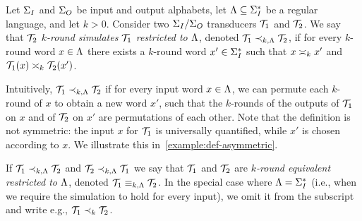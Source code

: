Let $\sI$ and $\sO$ be input and output alphabets, let $\fL\subseteq \sI^*$ be a regular language, and let $k>0$. Consider two $\sI/\sO$ transducers $\cT_1$ and $\cT_2$. We say that \emph{$\cT_2$ $k$-round simulates $\cT_1$ restricted to $\fL$}, denoted $\cT_1\prec_{k,\fL} \cT_2$, if for every $k$-round word $x\in \fL$ there exists a $k$-round word $x'\in \sI^*$ such that $x\req[k] x'$ and $\cT_1(x)\req[k] \cT_2(x')$. 

Intuitively, $\cT_1\prec_{k,\fL} \cT_2$ if for every input word $x\in \fL$, we can permute each $k$-round of $x$ to obtain a new word $x'$, such that the $k$-rounds of the outputs of $\cT_1$ on $x$ and of $\cT_2$ on $x'$ are permutations of each other. 
Note that the definition is not symmetric: the input $x$ for $\cT_1$ is universally quantified, while $x'$ is chosen according to $x$. We illustrate this in~\cref{example:def-asymmetric}.

If $\cT_1\prec_{k,\fL} \cT_2$ and $\cT_2\prec_{k,\fL} \cT_1$ we say that $\cT_1$ and $\cT_2$ are \emph{$k$-round equivalent restricted to $\fL$}, denoted $\cT_1\equiv_{k,\fL} \cT_2$. 
In the special case where $\fL=\sI^*$ (i.e., when we require the simulation to hold for every input), we omit it from the subscript and write e.g., $\cT_1\prec_k \cT_2$.

